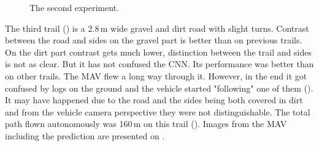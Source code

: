 \begin{figure}[!h]

  \centering

  \centering	
  


  \caption{The second experiment.}
  \label{fig:second_trail_photos}
\end{figure}

The third trail () is a 2.8\,m wide gravel and dirt road with slight turns. Contrast between the road and sides on the gravel part is better than on previous trails. On the dirt part contrast gets much lower, distinction between the trail and sides is not as clear. But it has not confused the \acs{CNN}. Its performance was better than on other trails. The \acs{MAV} flew a long way through it. However, in the end it got confused by logs on the ground and the vehicle started "following" one of them (). It may have happened due to the road and the sides being both covered in dirt and from the vehicle camera perspective they were not distinguishable. The total path flown autonomously was 160\,m on this trail (). Images from the \acs{MAV} including the prediction are presented on .

